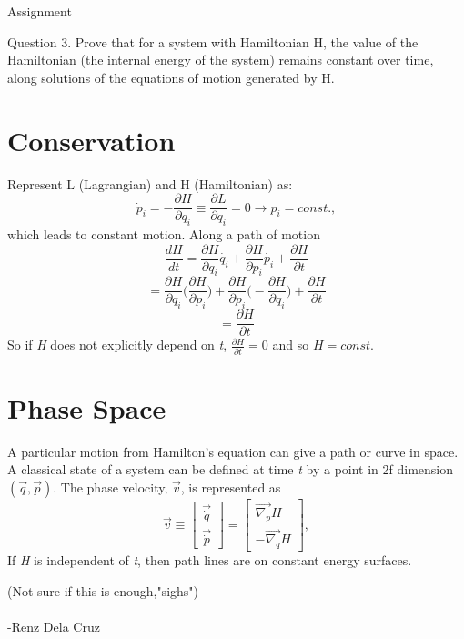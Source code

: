 \documentclass[12pt, letterpaper, oneside, article]{memoir}
\begin{document}
Assignment
\vspace{5mm}

Question 3. Prove that for a system with Hamiltonian H, the value of the Hamiltonian (the internal energy of the system) remains constant over time, along solutions of the equations of motion generated by H. 
\vspace{5mm}

\chapter{Conservation}

Represent L (Lagrangian) and H (Hamiltonian) as:
$$\dot p_i=-\frac{\partial H}{\partial q_i}\equiv\frac{\partial L}{\partial q_i}=0\rightarrow p_i=const.,$$
which leads to constant motion.
\vspace{5mm}
Along a path of motion
$$\frac{dH}{dt}=\frac{\partial H}{\partial q_i}\dot{q_i}+\frac{\partial H}{\partial p_i}\dot{p_i}+\frac{\partial H}{\partial t}$$
$$=\frac{\partial H}{\partial q_i}\Big(\frac{\partial H}{\partial p_i}\Big)+\frac{\partial H}{\partial p_i}\Big(-\frac{\partial H}{\partial q_i}\Big)+\frac{\partial H}{\partial t}$$
$$=\frac{\partial H}{\partial t}$$
\vspace{5mm}
So if \textit{H} does not explicitly depend on \textit{t}, $\frac{\partial H}{\partial t}=0$ and so $H=const.$
\vspace{15mm}
\chapter{Phase Space}
\vspace{5mm}
A particular motion from Hamilton's equation can give a path or curve in space. A classical state of a system can be defined at time \textit{t} by a point in 2f dimension $(\vec{q},\vec{p})$.
\vspace{5mm}
The phase velocity, $\vec{v}$, is represented as $$\vec{v}\equiv\begin{bmatrix}
\vec{\dot q}\\
\vec{\dot p}
\end{bmatrix}
=
\begin{bmatrix}
\vec{\nabla_p}H\\
-\vec{\nabla_q}H
\end{bmatrix},
$$
If \textit{H} is independent of \textit{t}, then path lines are on constant energy surfaces.

\vspace{20mm}

(Not sure if this is enough,"sighs")\\\\
-Renz Dela Cruz
\end{document}
